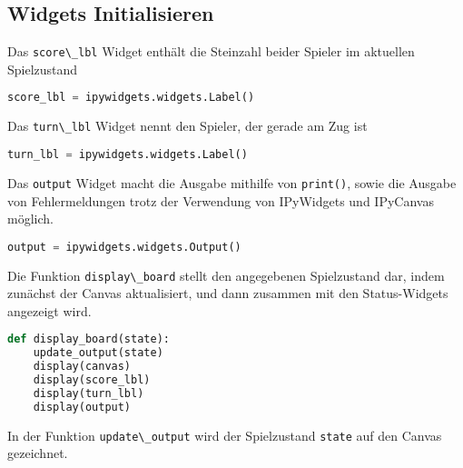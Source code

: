 \hypertarget{widgets-initialisieren}{%
\subsection{Widgets Initialisieren}\label{widgets-initialisieren}}

Das \passthrough{\lstinline!score\_lbl!} Widget enthält die Steinzahl
beider Spieler im aktuellen Spielzustand

\begin{lstlisting}[language=Python]
score_lbl = ipywidgets.widgets.Label()
\end{lstlisting}

Das \passthrough{\lstinline!turn\_lbl!} Widget nennt den Spieler, der
gerade am Zug ist

\begin{lstlisting}[language=Python]
turn_lbl = ipywidgets.widgets.Label()
\end{lstlisting}

Das \passthrough{\lstinline!output!} Widget macht die Ausgabe mithilfe
von \passthrough{\lstinline!print()!}, sowie die Ausgabe von
Fehlermeldungen trotz der Verwendung von IPyWidgets und IPyCanvas
möglich.

\begin{lstlisting}[language=Python]
output = ipywidgets.widgets.Output()
\end{lstlisting}

Die Funktion \passthrough{\lstinline!display\_board!} stellt den
angegebenen Spielzustand dar, indem zunächst der Canvas aktualisiert,
und dann zusammen mit den Status-Widgets angezeigt wird.

\begin{lstlisting}[language=Python]
def display_board(state):
    update_output(state)
    display(canvas)
    display(score_lbl)
    display(turn_lbl)
    display(output)
\end{lstlisting}

In der Funktion \passthrough{\lstinline!update\_output!} wird der
Spielzustand \passthrough{\lstinline!state!} auf den Canvas gezeichnet.

